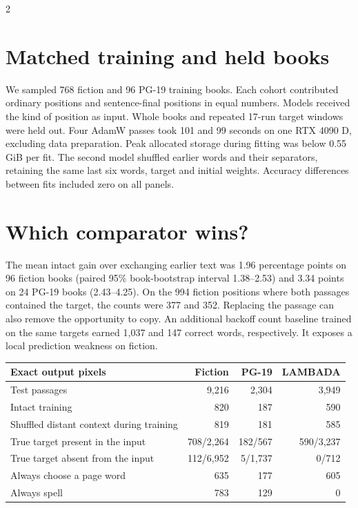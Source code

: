 \begin{multicols}{2}
\section*{Matched training and held books}
We sampled 768 fiction and 96 PG-19 training books.\cite{rae,lambada} Each cohort contributed ordinary positions and sentence-final positions in equal numbers. Models received the kind of position as input. Whole books and repeated 17-run target windows were held out. Four AdamW passes took 101 and 99 seconds on one RTX 4090 D, excluding data preparation. Peak allocated storage during fitting was below 0.55 GiB per fit. The second model shuffled earlier words and their separators, retaining the same last six words, target and initial weights. Accuracy differences between fits included zero on all panels.
\columnbreak
\section*{Which comparator wins?}
The mean intact gain over exchanging earlier text was 1.96 percentage points on 96 fiction books (paired 95\% book-bootstrap interval 1.38--2.53) and 3.34 points on 24 PG-19 books (2.43--4.25). On the 994 fiction positions where both passages contained the target, the counts were 377 and 352. Replacing the passage can also remove the opportunity to copy. An additional backoff count baseline trained on the same targets earned 1,037 and 147 correct words, respectively. It exposes a local prediction weakness on fiction.
\end{multicols}
\begin{center}\small
\begin{tabular}{@{}lrrr@{}}\toprule
Exact output pixels & Fiction & PG-19 & LAMBADA \\ \midrule
Test passages & 9,216 & 2,304 & 3,949 \\
Intact training & 820 & 187 & 590 \\
Shuffled distant context during training & 819 & 181 & 585 \\
True target present in the input & 708/2,264 & 182/567 & 590/3,237 \\
True target absent from the input & 112/6,952 & 5/1,737 & 0/712 \\
Always choose a page word & 635 & 177 & 605 \\
Always spell & 783 & 129 & 0 \\
\bottomrule\end{tabular}\end{center}
